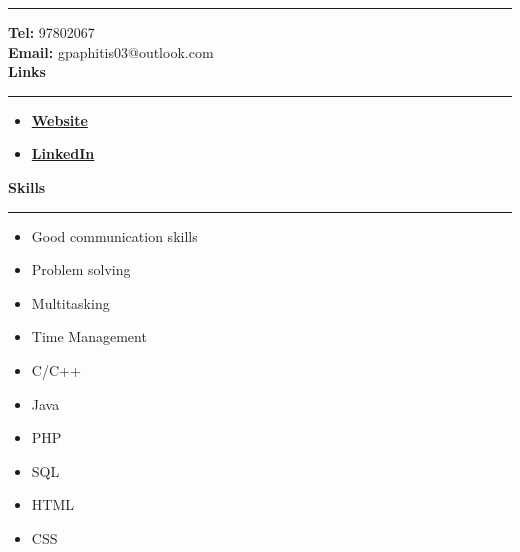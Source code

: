 \documentclass[12pt]{article}
\begin{document}
\begin{paracol}{2}
\begin{tcolorbox}[colback=bgcolor, colframe=bgcolor, boxrule=0pt, arc=0pt, outer arc=0pt, left=10pt, right=8pt, top=20pt, bottom=10pt,height=\textheight]
      \hrule
      \vspace{0.2cm}
      {\fontsize{10pt}{18pt}\selectfont
         \textbf{Tel:} 97802067\\
         \textbf{Email:} gpaphitis03@outlook.com\\
      }
      \vspace{0.5cm}
      {\fontsize{12pt}{18pt}\selectfont
         \textbf{{\large Links}}\\
         }
      \vspace{0.15cm}
      \hrule
      \vspace{0.2cm}
      {\fontsize{10pt}{13pt}\selectfont
      \begin{itemize}[leftmargin=15pt, itemsep=0pt, topsep=0pt]
         \item\href{https://giorgospaphitis.com}{\textbf{Website}}\\
         \item\href{https://www.linkedin.com/in/giorgos-paphitis-7307a825b/}{\textbf{LinkedIn}}\\
      \end{itemize}
      }
      \vspace{0.5cm}
      {\fontsize{12pt}{18pt}\selectfont
         \textbf{{\large Skills}}\\
         }
      \vspace{0.15cm}
      \hrule
      \vspace{0.2cm}
      {\fontsize{10pt}{13pt}\selectfont
      \begin{itemize}[leftmargin=15pt, itemsep=0pt, topsep=0pt]
         \item Good communication skills\\
         \item Problem solving\\
         \item Multitasking\\
         \item Time Management\\
         \item C/C++\\
         \item Java\\
         \item PHP\\
         \item SQL\\
         \item HTML\\
         \item CSS\\

\end{itemize}}
\end{tcolorbox}
\end{paracol}
\end{document}
